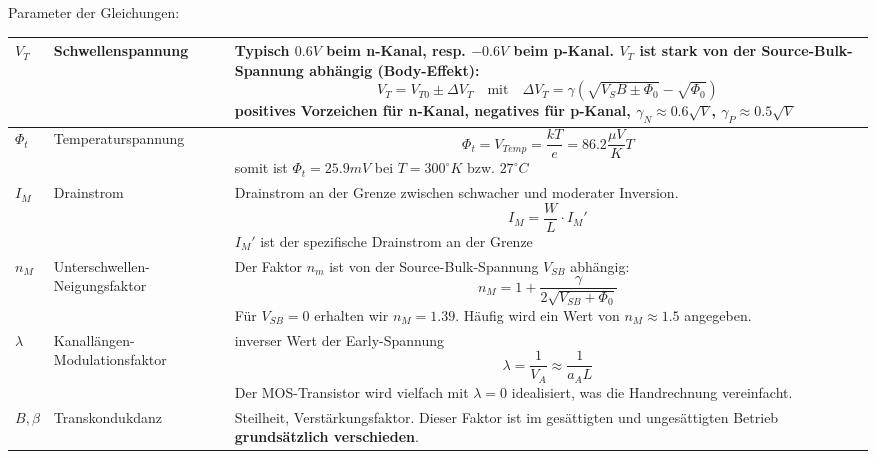 Parameter der Gleichungen:

\begin{tabularx}{\linewidth}{|l|l|X|}
	\hline
		$V_T$ & Schwellenspannung &
		Typisch $0.6V$ beim n-Kanal, resp. $-0.6V$ beim p-Kanal. $V_T$ ist stark von der Source-Bulk-Spannung abhängig (Body-Effekt):
		\[ 
			V_T = V_{T0} \pm \Delta V_T \quad \text{mit} \quad \Delta V_T = \gamma(\sqrt{V_SB \pm \Phi_0} -\sqrt{\Phi_0})
		\]
		positives Vorzeichen für n-Kanal, negatives für p-Kanal, $\gamma_N \approx 0.6\sqrt{V}$, $\gamma_P \approx 0.5\sqrt{V}$ 
	\\ \hline
		$\Phi_t$ & Temperaturspannung &
		\[
			\Phi_t = V_{Temp} = \frac{kT}{e} = 86.2 \frac{\mu V}{K}T
		\]
		somit ist $\Phi_t = 25.9mV$ bei $T=300^\circ K$ bzw. $27^\circ C$
	\\ \hline
		$I_M$ & Drainstrom &
		Drainstrom an der Grenze zwischen schwacher und moderater Inversion.
		\[
			I_M = \frac{W}{L} \cdot I_M'
		\]
		$I_M'$ ist der spezifische Drainstrom an der Grenze
	\\ \hline
		$n_M$ & Unterschwellen-Neigungsfaktor &
		Der Faktor $n_m$ ist von der Source-Bulk-Spannung $V_{SB}$ abhängig:
		\[
			n_M = 1 + \frac{\gamma}{2 \sqrt{V_{SB} + \Phi_0}}
		\]
		Für $V_{SB} = 0$ erhalten wir $n_M=1.39$. Häufig wird ein Wert von $n_M \approx 1.5$ angegeben.
	\\ \hline
		$\lambda$ & Kanallängen-Modulationsfaktor &
		inverser Wert der Early-Spannung
		\[
			\lambda = \frac{1}{V_A} \approx \frac{1}{a_A L}
		\]
		Der MOS-Transistor wird vielfach mit $\lambda = 0$ idealisiert, was die Handrechnung vereinfacht.
	\\ \hline
		$B, \beta$ & Transkondukdanz &
		Steilheit, Verstärkungsfaktor. Dieser Faktor ist im gesättigten und ungesättigten Betrieb \textbf{grundsätzlich verschieden}.
	\\ \hline
\end{tabularx}